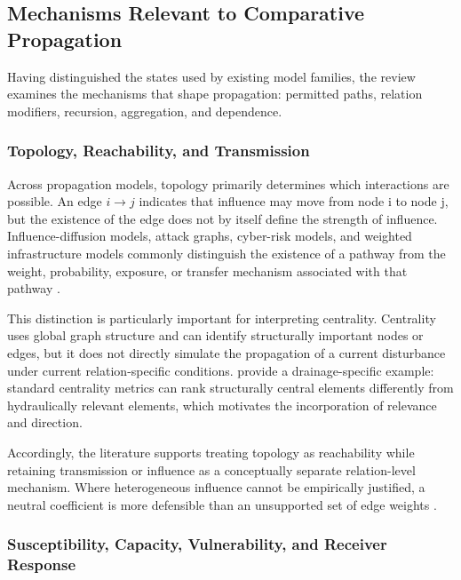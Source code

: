 

\subsection{Mechanisms Relevant to Comparative Propagation}
Having distinguished the states used by existing model families, the review
examines the mechanisms that shape propagation: permitted paths, relation
modifiers, recursion, aggregation, and dependence.

\subsubsection{Topology, Reachability, and
Transmission}\label{topology-reachability-and-transmission}

Across propagation models, topology primarily determines which
interactions are possible. An edge $i\to j$ indicates that influence may move
from node i to node j, but the existence of the edge does not by itself
define the strength of influence. Influence-diffusion models, attack
graphs, cyber-risk models, and weighted infrastructure models commonly
distinguish the existence of a pathway from the weight, probability,
exposure, or transfer mechanism associated with that pathway
\citep{kempe2003,sheyner2002,kavallieratos2021,faraji2026,petrone2018}.

This distinction is particularly important for interpreting centrality.
Centrality uses global graph structure and can identify structurally
important nodes or edges, but it does not directly simulate the
propagation of a current disturbance under current relation-specific
conditions. \citet{simone2022} provide a drainage-specific example:
standard centrality metrics can rank structurally central elements
differently from hydraulically relevant elements, which motivates the
incorporation of relevance and direction.

Accordingly, the literature supports treating topology as reachability
while retaining transmission or influence as a conceptually separate
relation-level mechanism. Where heterogeneous influence cannot be
empirically justified, a neutral coefficient is more defensible than an
unsupported set of edge weights \citep{kempe2003,simone2022,dastgir2023}.

\subsubsection{Susceptibility, Capacity, Vulnerability, and Receiver
Response}\label{susceptibility-capacity-vulnerability-and-receiver-response}

